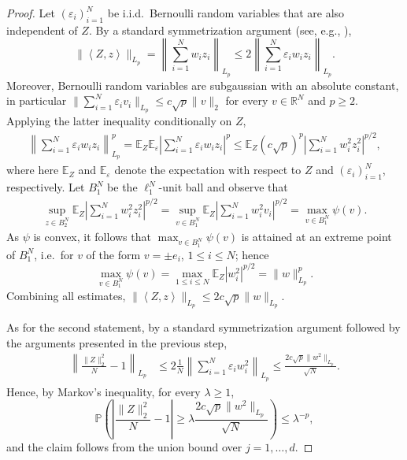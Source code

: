 \documentclass[11pt]{amsart}
\newcommand{\R}{\mathbb{R}}
\newcommand{\inr}[1]{\left\langle #1 \right\rangle}
\theoremstyle{definition}
\newcommand{\E}{\mathbb{E}}
\renewcommand{\P}{\mathbb{P}}
\numberwithin{equation}{section}
\begin{document}
\begin{proof}
	Let $(\varepsilon_i)_{i=1}^N$ be i.i.d.\ Bernoulli random variables that are also independent of $Z$.
	By a standard symmetrization argument (see, e.g., \cite[Lemma 6.3]{ledoux1991probability}),
	\[ \|\inr{Z,z}\|_{L_p} 
	=\left\| \sum_{i=1}^N w_{i}  z_i \right\|_{L_p}
	\leq 2 \left\| \sum_{i=1}^N \varepsilon_i w_{i } z_i \right\|_{L_p}.\]
	Moreover, Bernoulli random variables are subgaussian with an absolute constant, in particular $\|\sum_{i=1}^N \varepsilon_i v_i \|_{L_p}\leq c \sqrt{p}\|v\|_2$ for every $v\in\R^N$ and $p\geq 2$.
	Applying the latter inequality  conditionally on $Z$,
	\begin{align*}
	\left\| \sum_{i=1}^N \varepsilon_i w_{i} z_i  \right\|_{L_p}^p
	=\E_Z\E_{\varepsilon}\left| \sum_{i=1}^N \varepsilon_i w_{i} z_{i} \right|^p
	\leq \E_Z  \left(c\sqrt{p}\right)^p  \left| \sum_{i=1}^N  w_{i}^2 z_i^2 \right|^{p/2},
	\end{align*}
	where here $\E_Z$ and $\E_{\varepsilon}$ denote the expectation  with respect to $Z$ and $(\varepsilon_i)_{i=1}^N$, respectively. 
	Let $B_1^N$  be the $\ell_1^N$-unit ball and observe that
	\begin{align*}
	\sup_{z\in B_2^N} \E_Z \left| \sum_{i=1}^N w_{i}^2 z_i^2 \right|^{p/2}
	=\sup_{v\in B_1^N} \E_Z \left| \sum_{i=1}^N w_{i}^2 v_i \right|^{p/2}
	=\max_{v\in B_1^N} \psi(v).
	\end{align*}
	As $\psi$ is convex, it follows that $\max_{v\in B_1^N} \psi(v)$ is attained at an extreme point of $B_1^N$, i.e.\ for $v$ of the form $v=\pm e_i$, $1\leq i\leq N$; hence
	\[\max_{v\in B_1^N} \psi(v)
	=\max_{1\leq i\leq N} \E_Z \left|  w_{i}^2  \right|^{p/2}
	=\|w\|_{L_p}^p.\]
	Combining all estimates, $\| \inr{Z,z}\|_{L_p} \leq  2c \sqrt{p} \|w\|_{L_p}$.
	
	As for the second statement, by a standard symmetrization argument followed by the arguments presented in the previous step, 
	\begin{align*}
	\left\| \frac{\|Z\|_{2}^{2}}{N} - 1 \right\|_{L_{p}}
	&\leq 2 \frac{1}{N} \left\| \sum_{i=1}^N \varepsilon_i w_{i }^{2} \right\|_{L_p} 
	\leq \frac{2c  \sqrt{p} \|w^{2}\|_{L_{p}}}{\sqrt N}.
	\end{align*}
	Hence, by Markov's inequality, for every $\lambda\geq 1$,
	\[ \P\left( \left| \frac{ \|Z\|_{2}^{2} }{N} - 1 \right| \geq \lambda  \frac{2c\sqrt{p} \|w^{2}\|_{L_{p}} }{\sqrt N} \right)\leq \lambda^{-p},\]
	and the claim follows from the union bound over $j=1,\dots, d$.
\end{proof}
\end{document}
